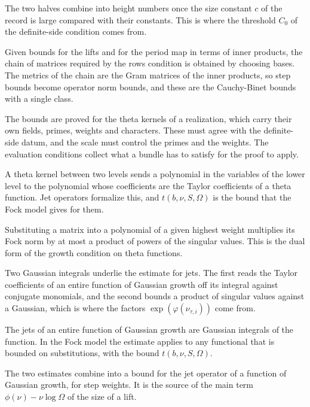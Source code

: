 The two halves combine into height numbers once the size constant $c$ of the record is large
compared with their constants. This is where the threshold $C_0$ of the definite-side condition
comes from.

Given bounds for the lifts and for the period map in terms of inner products, the chain of
matrices required by the rows condition is obtained by choosing bases. The metrics of the chain are
the Gram matrices of the inner products, so step bounds become operator norm bounds, and these are
the Cauchy-Binet bounds with a single class.

The bounds are proved for the theta kernels of a realization, which carry their own fields, primes,
weights and characters. These must agree with the definite-side datum, and the scale must control
the primes and the weights. The evaluation conditions collect what a bundle has to satisfy for the
proof to apply.

A theta kernel between two levels sends a polynomial in the variables of the lower level to the
polynomial whose coefficients are the Taylor coefficients of a theta function. Jet operators
formalize this, and $t(b,\nu,S,\Omega)$ is the bound that the Fock model gives for them.

Substituting a matrix into a polynomial of a given highest weight multiplies its Fock norm by at
most a product of powers of the singular values. This is the dual form of the growth condition on
theta functions.

Two Gaussian integrals underlie the estimate for jets. The first reads the Taylor coefficients of an
entire function of Gaussian growth off its integral against conjugate monomials, and the second bounds
a product of singular values against a Gaussian, which is where the factors
$\exp(\varphi(\nu_{\tau,i}))$ come from.

The jets of an entire function of Gaussian growth are Gaussian integrals of the function. In the Fock
model the estimate applies to any functional that is bounded on substitutions, with the bound
$t(b,\nu,S,\Omega)$.

The two estimates combine into a bound for the jet operator of a function of Gaussian growth, for
step weights. It is the source of the main term $\phi(\nu)-\nu\log\Omega$ of the size of a lift.

